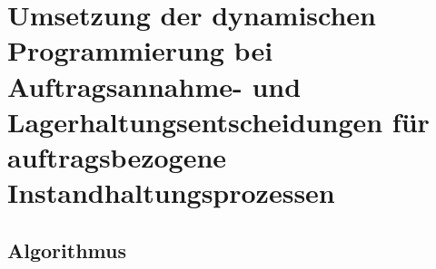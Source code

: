 \chapter{Umsetzung der dynamischen Programmierung bei Auftragsannahme- und Lagerhaltungsentscheidungen für auftragsbezogene Instandhaltungsprozessen}
\setcounter{footnote}{8}

\section{Algorithmus}



